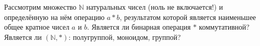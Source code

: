 Рассмотрим множество $\mathbb N$ натуральных чисел (ноль не включается!) и определённую на нём операцию
$a * b$, результатом которой является наименьшее общее кратное чисел $a$ и $b$.
Является ли бинарная операция $*$ коммутативной?
Является ли $(\mathbb N, *)$: полугруппой, моноидом, группой?
